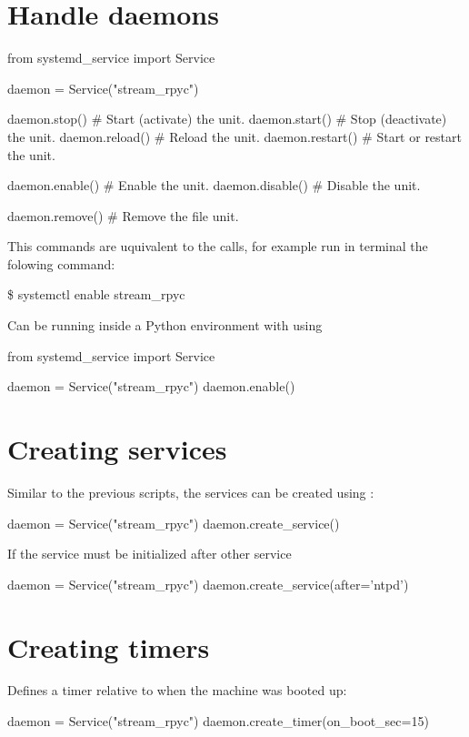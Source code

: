 \section{Handle daemons}
\begin{python}
from systemd_service import Service

daemon = Service("stream_rpyc")

daemon.stop()     # Start (activate) the unit.
daemon.start()    # Stop (deactivate) the unit.
daemon.reload()   # Reload the unit.  
daemon.restart()  # Start or restart the unit.

daemon.enable()   # Enable the unit.
daemon.disable()  # Disable the unit.

daemon.remove()   # Remove the file unit.
\end{python}
This commands are uquivalent to the  calls, for example run in terminal the folowing command:
\begin{python}
\$ systemctl enable stream_rpyc
\end{python}
Can be running inside a Python environment with using 
\begin{python}
from systemd_service import Service

daemon = Service("stream_rpyc")
daemon.enable()
\end{python}


\section{Creating services}
Similar to the previous scripts, the services can be created using :

\begin{python}
daemon = Service("stream_rpyc")
daemon.create_service()
\end{python}
If the service must be initialized after other service
\begin{python}
daemon = Service("stream_rpyc")
daemon.create_service(after='ntpd')
\end{python}


\section{Creating timers}
Defines a timer relative to when the machine was booted up:
\begin{python}
daemon = Service("stream_rpyc")
daemon.create_timer(on_boot_sec=15)
\end{python}


